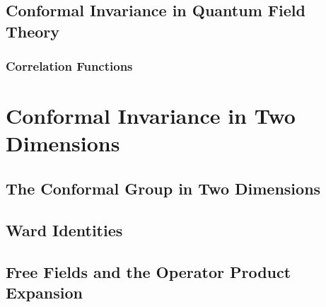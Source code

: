 \documentclass[10pt]{article}
\begin{document}
\subsection{Conformal Invariance in Quantum Field Theory}
\subsubsection{Correlation Functions}
\section{Conformal Invariance in Two Dimensions}
\subsection{The Conformal Group in Two Dimensions}
\subsection{Ward Identities}
\subsection{Free Fields and the Operator Product Expansion}

\clearpage


\end{document}
